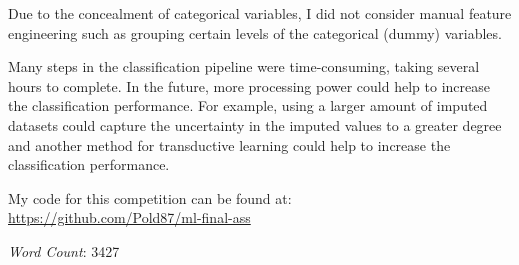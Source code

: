 \documentclass[a4paper]{article}
\begin{document}
Due to the concealment of categorical variables, I did not consider
manual feature engineering such as grouping certain levels of the
categorical (dummy) variables.

Many steps in the classification pipeline were time-consuming, taking
several hours to complete. In the future, more processing power could
help to increase the classification performance. For example, using a
larger amount of imputed datasets could capture the uncertainty in the
imputed values to a greater degree and another method for
transductive learning could help to increase the classification performance.

My code for this competition can be found at:\\
\url{https://github.com/Pold87/ml-final-ass}

\emph{Word Count}: 3427
\printbibliography
\end{document}
